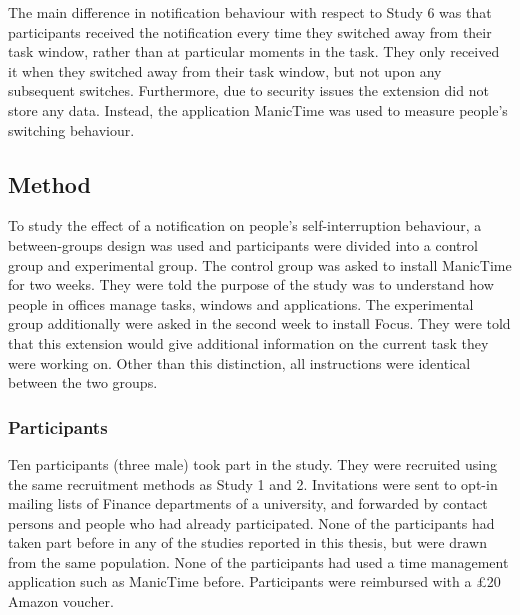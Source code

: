 The main difference in notification behaviour with respect to Study 6 was that participants received the notification every time they switched away from their task window, rather than at particular moments in the task. They only received it when they switched away from their task window, but not upon any subsequent switches. Furthermore, due to security issues the extension did not store any data. Instead, the application ManicTime was used to measure people's switching behaviour. 


\subsection{Method}
To study the effect of a notification on people's self-interruption behaviour, a between-groups design was used and participants were divided into a control group and experimental group. The control group was asked to install ManicTime for two weeks. They were told the purpose of the study was to understand how people in offices manage tasks, windows and applications. The experimental group additionally were asked in the second week to install Focus. They were told that this extension would give additional information on the current task they were working on. Other than this distinction, all instructions were identical between the two groups. 


\subsubsection{Participants}
Ten participants (three male) took part in the study. They were recruited using the same recruitment methods as Study 1 and 2. Invitations were sent to opt-in mailing lists of Finance departments of a university, and forwarded by contact persons and people who had already participated. None of the participants had taken part before in any of the studies reported in this thesis, but were drawn from the same population. None of the participants had used a time management application such as ManicTime before. Participants were reimbursed with a \pounds 20 Amazon voucher.

